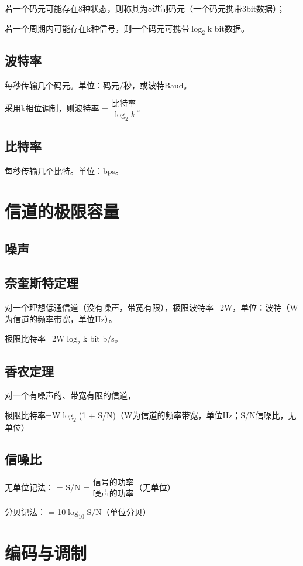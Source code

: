 若一个码元可能存在8种状态，则称其为8进制码元（一个码元携带3bit数据）；

若一个周期内可能存在k种信号，则一个码元可携带\(\log_2\)k bit数据。


\subsection{波特率}
每秒传输几个码元。单位：码元/秒，或波特Baud。

采用k相位调制，则波特率 = \(\dfrac{\text{比特率}}{\log_2k}\)。


\subsection{比特率}
每秒传输几个比特。单位：bps。


\section{信道的极限容量}

\subsection{噪声}


\subsection{奈奎斯特定理}
对一个理想低通信道（没有噪声，带宽有限），极限波特率=2W，单位：波特（W为信道的频率带宽，单位Hz）。

极限比特率=2W\(\log_2\)k bit b/s。


\subsection{香农定理}
对一个有噪声的、带宽有限的信道，

极限比特率=W\(\log_2\)(1 + S/N)（W为信道的频率带宽，单位Hz；S/N信噪比，无单位）


\subsection{信噪比}
无单位记法： = S/N = \(\dfrac{\text{信号的功率}}{\text{噪声的功率}}\)（无单位）

分贝记法： = 10\(\log_{10}\)S/N（单位分贝）


\section{编码与调制}

